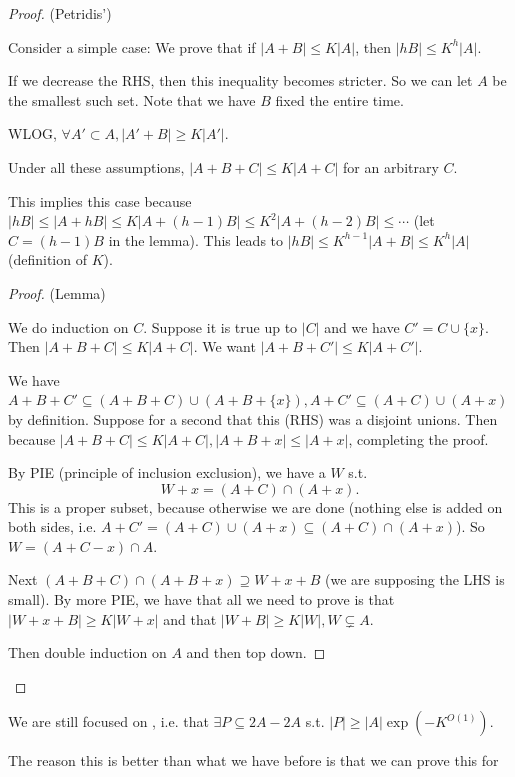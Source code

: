 \documentclass[a4paper]{article}
\begin{document}
\begin{proof}
	(Petridis')

	Consider a simple case:
	We prove that if $|A+B| \le K|A| $, then $|hB| \le K^h |A|$.

	If we decrease the RHS, then this inequality becomes stricter.
	So we can let $A $ be the smallest such set.
	Note that we have $B $ fixed the entire time.

	WLOG, $\forall A' \subset A, |A'+B| \ge K|A'| $.
	\begin{lem}
		Under all these assumptions, $|A+B+C| \le K|A+C| $ for an arbitrary $C $.
	\end{lem}

	This implies this case because $|hB| \le |A+hB| \le K|A+(h-1)B| \le K^2|A+(h-2)B| \le \cdots$ (let $C = (h-1)B $ in the lemma).
	This leads to $|hB| \le K^{h-1}|A+B| \le K^{h}|A|   $ (definition of $K $).

	\begin{proof}
		(Lemma)

		We do induction on $C $.
		Suppose it is true up to $|C| $ and we have $C' = C \cup \{x\}   $.
		Then $|A+B+C| \le K|A+C| $.
		We want $|A+B+C'| \le K|A+C'| $.

		We have $A+B+C' \subseteq (A+B+C)\cup (A+B+\{x\}), A+C' \subseteq (A+C) \cup (A+x)$ by definition.
		Suppose for a second that this (RHS) was a disjoint unions.
		Then because $|A+B+C| \le K|A+C|, |A+B+x| \le |A+x| $, completing the proof.

		By PIE (principle of inclusion exclusion), we have a $W $ s.t.
		\[
			W+x = (A+C)\cap (A+x)
		.\]
		This is a proper subset, because otherwise we are done (nothing else is added on both sides, i.e. $A+C' = (A+C)\cup(A+x) \subseteq (A+C)\cap (A+x) $).
		So $W = (A+C-x) \cap A $.

		Next $(A+B+C)\cap(A+B+x) \supseteq W + x+B $ (we are supposing the LHS is small).
		By more PIE, we have that all we need to prove is that $|W+x+B| \ge K|W+x| $ and that $|W+B| \ge K|W|, W \subsetneq A $.

		Then double induction on $A $ and then top down.
	\end{proof}
\end{proof}

We are still focused on , i.e. that $\exists P\subseteq 2A-2A $ s.t. $|P| \ge |A| \exp(-K^{O(1)})  $.

The reason this is better than what we have before is that we can prove this for
\end{document}

